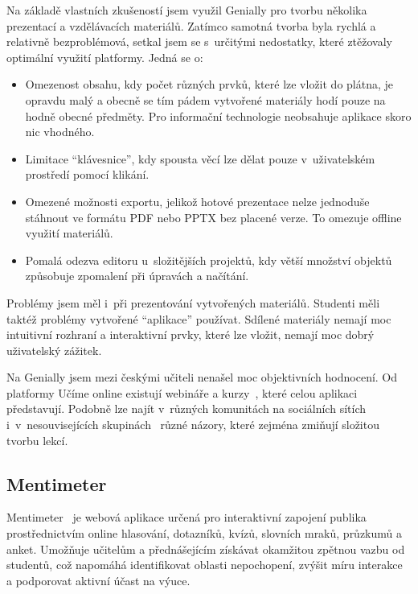 Na základě vlastních zkušeností jsem využil Genially pro tvorbu několika prezentací a vzdělávacích materiálů. 
Zatímco samotná tvorba byla rychlá a relativně bezproblémová, setkal jsem se s~určitými nedostatky, které ztěžovaly optimální využití platformy. 
Jedná se o:

\begin{itemize}
    \item Omezenost obsahu, kdy počet různých prvků, které lze vložit do plátna, je opravdu malý a obecně se tím pádem vytvořené materiály hodí pouze na hodně obecné předměty. Pro informační technologie neobsahuje aplikace skoro nic vhodného.  
    \item Limitace \enquote{klávesnice}, kdy spousta věcí lze dělat pouze v~uživatelském prostředí pomocí klikání. 
    \item Omezené možnosti exportu, jelikož hotové prezentace nelze jednoduše stáhnout ve formátu PDF nebo PPTX bez placené verze. To omezuje offline využití materiálů.  
    \item Pomalá odezva editoru u~složitějších projektů, kdy větší množství objektů způsobuje zpomalení při úpravách a načítání.  
\end{itemize}

Problémy jsem měl i~při prezentování vytvořených materiálů. 
Studenti měli taktéž problémy vytvořené \enquote{aplikace} používat. 
Sdílené materiály nemají moc intuitivní rozhraní a interaktivní prvky, které lze vložit, nemají moc dobrý uživatelský zážitek.

Na Genially jsem mezi českými učiteli nenašel moc objektivních hodnocení.
Od platformy Učíme online existují webináře a kurzy~\cite{genially_ucimeonline}, které celou aplikaci představují.
Podobně lze najít v~různých komunitách na sociálních sítích i~v~nesouvisejících skupinách~\cite{canva_facebook} různé názory, které zejména zmiňují složitou tvorbu lekcí.

\subsection{Mentimeter}

Mentimeter~\cite{mentimeter} je webová aplikace určená pro interaktivní zapojení publika prostřednictvím online hlasování, dotazníků, kvízů, slovních mraků, průzkumů a anket. 
Umožňuje učitelům a přednášejícím získávat okamžitou zpětnou vazbu od studentů, což napomáhá identifikovat oblasti nepochopení, zvýšit míru interakce a podporovat aktivní účast na výuce. 

